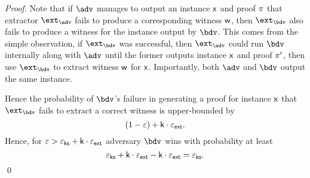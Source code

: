 \documentclass[runningheads,11pt]{llncs}
\begin{document}
\begin{proof}
  Note that if $\adv$ manages to output an instance $\mathsf{x}$ and proof $\pi$
  that extractor $\ext_\adv$ fails to produce a corresponding witness $\mathsf{w}$,
  then $\ext_\bdv$ also fails to produce a witness for the instance output by
  $\bdv$. This comes from the simple observation, if $\ext_\bdv$ was successful,
  then $\ext_\adv$ could run $\bdv$ internally along with $\adv$ until the former
  outputs instance $\mathsf{x}$ and proof $\pi'$, then use $\ext_\bdv$ to extract
  witness $\mathsf{w}$ for $\mathsf{x}$. Importantly, both $\adv$ and $\bdv$ output the same instance.

  Hence the probability of $\bdv$'s failure in generating a proof for instance
  $\mathsf{x}$ that $\ext_\bdv$ fails to extract a correct witness is upper-bounded by
  \[
    (1 - \varepsilon) + \mathsf{k} \cdot \varepsilon_{\mathsf{ext}}.
  \]
  Hence, for $\varepsilon > \varepsilon_{\mathsf{ks}} + \mathsf{k} \cdot \varepsilon_{\mathsf{ext}}$ adversary $\bdv$ wins with probability at least
  \[
    \varepsilon_{\mathsf{ks}} + \mathsf{k} \cdot \varepsilon_{\mathsf{ext}} - \mathsf{k} \cdot \varepsilon_{\mathsf{ext}}  = \varepsilon_{\mathsf{ks}}.
  \]
  \qed
\end{proof}



\end{document}
